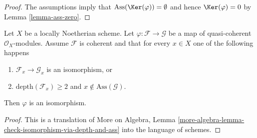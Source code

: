 \begin{proof}
The assumptions imply that $\text{Ass}(\Ker(\varphi)) = \emptyset$
and hence $\Ker(\varphi) = 0$ by Lemma \ref{lemma-ass-zero}.
\end{proof}

\begin{lemma}
\label{lemma-check-isomorphism-via-depth-and-ass}
Let $X$ be a locally Noetherian scheme. Let
$\varphi : \mathcal{F} \to \mathcal{G}$ be a map of
quasi-coherent $\mathcal{O}_X$-modules. Assume $\mathcal{F}$ is coherent
and that for every $x \in X$ one of the following happens
\begin{enumerate}
\item $\mathcal{F}_x \to \mathcal{G}_x$ is an isomorphism, or
\item $\text{depth}(\mathcal{F}_x) \geq 2$ and
$x \not \in \text{Ass}(\mathcal{G})$.
\end{enumerate}
Then $\varphi$ is an isomorphism.
\end{lemma}

\begin{proof}
This is a translation of More on Algebra, Lemma
\ref{more-algebra-lemma-check-isomorphism-via-depth-and-ass}
into the language of schemes.
\end{proof}




